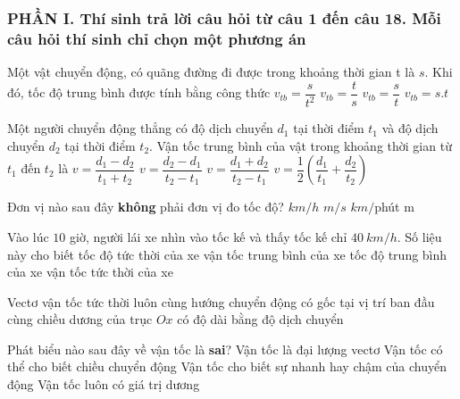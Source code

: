 \subsubsection*{PHẦN I. Thí sinh trả lời câu hỏi từ câu 1 đến câu 18. Mỗi câu hỏi thí sinh chỉ chọn một phương án}
\setcounter{ex}{0}
\begin{ex}%
Một vật chuyển động, có quãng đường đi được trong khoảng thời gian t là $s$. Khi đó, tốc độ trung bình được tính bằng công thức
\choice
{$v_{t b}=\dfrac{s}{t^2}$}
{$v_{t b}=\dfrac{t}{s}$}
{\True $v_{t b}=\dfrac{s}{t}$}
{$v_{t b}=s. t$}

 \end{ex}
\begin{ex}%
Một người chuyển động thẳng có độ dịch chuyển $d_1$ tại thời điểm $t_1$ và độ dịch chuyển $d_2$ tại thời điểm $t_2$. Vận tốc trung bình của vật trong khoảng thời gian từ $t_1$ đến $t_2$ là
\choice
{$v=\dfrac{d_1-d_2}{t_1+t_2}$}
{\True $v=\dfrac{d_2-d_1}{t_2-t_1}$}
{$v=\dfrac{d_1+d_2}{t_2-t_1}$}
{$v=\dfrac{1}{2}\left(\dfrac{d_1}{t_1}+\dfrac{d_2}{t_2}\right)$}

 \end{ex}
\begin{ex}%
Đơn vị nào sau đây \textbf{không} phải đơn vị đo tốc độ?
\choice
{$km / h$}
{$m/s$}
{$km/$phút}
{\True m}

\loigiai{

}
 \end{ex}
\begin{ex}%
Vào lúc $10$ giờ, người lái xe nhìn vào tốc kế và thấy tốc kế chỉ $40\ km/h$. Số liệu này cho biết
\choice
{\True tốc độ tức thời của xe}
{vận tốc trung bình của xe}
{tốc độ trung bình của xe}
{vận tốc tức thời của xe}
\loigiai{
}
 \end{ex}
\begin{ex}%
Vectơ vận tốc tức thời
\choice
{\True luôn cùng hướng chuyển động}
{có gốc tại vị trí ban đầu}
{cùng chiều dương của trục $Ox$}
{có độ dài bằng độ dịch chuyển}

\loigiai{
}
 \end{ex}
\begin{ex}%
Phát biểu nào sau đây về vận tốc là \textbf{sai}?
\choice
{Vận tốc là đại lượng vectơ}
{Vận tốc có thể cho biết chiều chuyển động}
{Vận tốc cho biết sự nhanh hay chậm của chuyển động}
{\True Vận tốc luôn có giá trị dương}
\loigiai{

}
 \end{ex}
